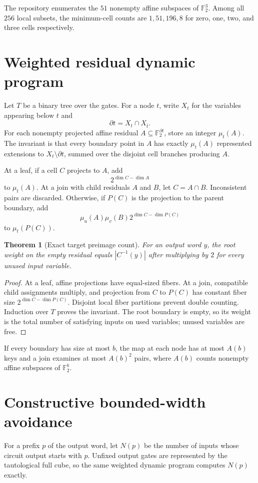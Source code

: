 \documentclass[11pt]{article}
\newtheorem{theorem}{Theorem}[section]
\newcommand{\Ftwo}{\mathbb F_2}
\begin{document}
The repository enumerates the $51$ nonempty affine subspaces of $\Ftwo^3$. Among all $256$ local subsets, the minimum-cell counts are $1,51,196,8$ for zero, one, two, and three cells respectively.

\section{Weighted residual dynamic program}
Let $T$ be a binary tree over the gates. For a node $t$, write $X_t$ for the variables appearing below $t$ and
\[
\partial t=X_t\cap X_{\overline t}.
\]
For each nonempty projected affine residual $A\subseteq\Ftwo^{\partial t}$, store an integer $\mu_t(A)$. The invariant is that every boundary point in $A$ has exactly $\mu_t(A)$ represented extensions to $X_t\setminus\partial t$, summed over the disjoint cell branches producing $A$.

At a leaf, if a cell $C$ projects to $A$, add
\[
2^{\dim C-\dim A}
\]
to $\mu_t(A)$. At a join with child residuals $A$ and $B$, let $C=A\cap B$. Inconsistent pairs are discarded. Otherwise, if $P(C)$ is the projection to the parent boundary, add
\[
\mu_u(A)\mu_v(B)2^{\dim C-\dim P(C)}
\]
to $\mu_t(P(C))$.

\begin{theorem}[Exact target preimage count]
For an output word $y$, the root weight on the empty residual equals $|C^{-1}(y)|$ after multiplying by $2$ for every unused input variable.
\end{theorem}

\begin{proof}
At a leaf, affine projections have equal-sized fibers. At a join, compatible child assignments multiply, and projection from $C$ to $P(C)$ has constant fiber size $2^{\dim C-\dim P(C)}$. Disjoint local fiber partitions prevent double counting. Induction over $T$ proves the invariant. The root boundary is empty, so its weight is the total number of satisfying inputs on used variables; unused variables are free.
\end{proof}

If every boundary has size at most $b$, the map at each node has at most $A(b)$ keys and a join examines at most $A(b)^2$ pairs, where $A(b)$ counts nonempty affine subspaces of $\Ftwo^b$.

\section{Constructive bounded-width avoidance}
For a prefix $p$ of the output word, let $N(p)$ be the number of inputs whose circuit output starts with $p$. Unfixed output gates are represented by the tautological full cube, so the same weighted dynamic program computes $N(p)$ exactly.
\end{document}
